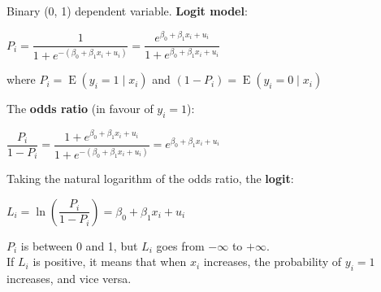 \documentclass[10pt, a4paper, landscape]{article}
\DeclareMathOperator{\E}{E}
\begin{document}
\begin{multicols}{3}
Binary (0, 1) dependent variable. \textbf{Logit model}:

\begin{center}
	\( P_{i} = \dfrac{1}{1 + e^{-(\beta_{0} + \beta_{1} x_{i} + u_{i})}}= \dfrac{e^{\beta_{0} + \beta_{1} x_{i} + u_{i}}}{1 + e^{\beta_{0} + \beta_{1} x_{i} + u_{i}}} \)
\end{center}

where \( P_{i} = \E(y_{i} = 1 \mid x_{i}) \) and \( (1 - P_{i}) = \E(y_{i} = 0 \mid x_{i}) \)

The \textbf{odds ratio} (in favour of \( y_{i} = 1 \)):

\begin{center}
	\( \dfrac{P_{i}}{1 - P_{i}} = \dfrac{1 + e^{\beta_{0} + \beta_{1} x_{i} + u_{i}}}{1 + e^{-(\beta_{0} + \beta_{1} x_{i} + u_{i})}} = e^{\beta_{0} + \beta_{1} x_{i} + u_{i}} \)
\end{center}

Taking the natural logarithm of the odds ratio, the \textbf{logit}:

\begin{center}
	\( L_{i} = \ln \left( \dfrac{P_i}{1 - P_i}\right) = \beta_{0} + \beta_{1} x_{i} + u_{i} \)
\end{center}

\setlength{\multicolsep}{6pt}
\begin{multicols}{2}

\( P_{i} \) is between 0 and 1, but \( L_{i} \) goes from \( -\infty \) to \( +\infty \). \\

If \( L_{i} \) is positive, it means that when \( x_{i} \) increases, the probability of \( y_{i} = 1 \) increases, and vice versa.

\columnbreak


\end{multicols}


\end{multicols}
\end{document}
